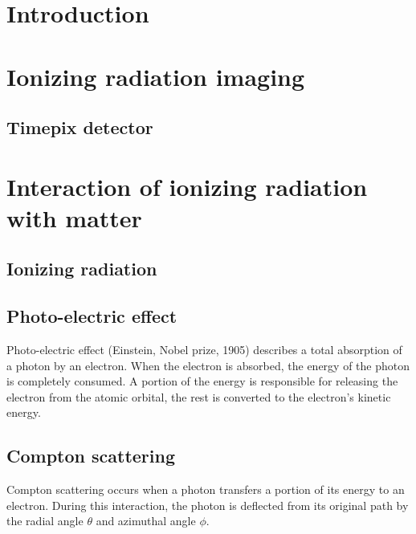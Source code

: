 \documentclass[a4paper,12pt,titlepage, twoside]{article}
\begin{document}


\section{Introduction}



\section{Ionizing radiation imaging}


\subsection{Timepix detector}


\clearpage


\section{Interaction of ionizing radiation with matter}

\subsection{Ionizing radiation}

\subsection{Photo-electric effect}

Photo-electric effect (Einstein, Nobel prize, 1905) describes a total absorption of a photon by an electron.
When the electron is absorbed, the energy of the photon is completely consumed.
A portion of the energy is responsible for releasing the electron from the atomic orbital, the rest is converted to the electron's kinetic energy.


\subsection{Compton scattering}

Compton scattering occurs when a photon transfers a portion of its energy to an electron.
During this interaction, the photon is deflected from its original path by the radial angle $\theta$ and azimuthal angle $\phi$.
\end{document}
